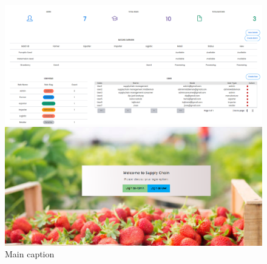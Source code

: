 \begin{figure}[ht]
    \centering
    \begin{minipage}[b]{\linewidth}
      \centering
      \includegraphics[width=\linewidth]{Chapters/Chapter_5/figures/dashboard.png}
    \end{minipage}
    \vspace{0.5cm}
    \hfill
    \begin{minipage}[b]{\linewidth}
      \centering
      \includegraphics[width=\linewidth]{Chapters/Chapter_5/figures/login.png}
    \end{minipage}
    \caption{Main caption}
    \label{fig:figure5_4}
    \end{figure}
